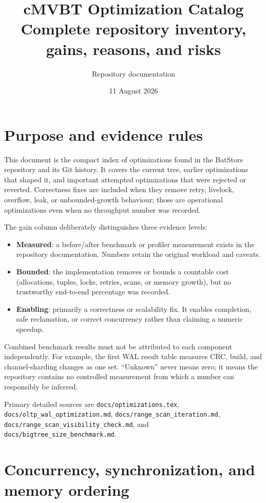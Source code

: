 \documentclass[10pt,a4paper,landscape]{article}
\title{cMVBT Optimization Catalog\\\large Complete repository inventory, gains, reasons, and risks}
\author{Repository documentation}
\date{11 August 2026}
\newcommand{\code}[1]{\texttt{#1}}
\newcommand{\gainmeasured}{\textbf{Measured}}
\newcommand{\gainbounded}{\textbf{Bounded}}
\newcommand{\gainenabling}{\textbf{Enabling}}
\begin{document}
\maketitle

\section*{Purpose and evidence rules}

This document is the compact index of optimizations found in the BatStore repository and
its Git history. It covers the current tree, earlier optimizations that shaped it, and
important attempted optimizations that were rejected or reverted. Correctness fixes are
included when they remove retry, livelock, overflow, leak, or unbounded-growth behaviour;
those are operational optimizations even when no throughput number was recorded.

The gain column deliberately distinguishes three evidence levels:

\begin{itemize}
  \item \gainmeasured{}: a before/after benchmark or profiler measurement exists in the
        repository documentation. Numbers retain the original workload and caveats.
  \item \gainbounded{}: the implementation removes or bounds a countable cost (allocations,
        tuples, locks, retries, scans, or memory growth), but no trustworthy end-to-end
        percentage was recorded.
  \item \gainenabling{}: primarily a correctness or scalability fix. It enables completion,
        safe reclamation, or correct concurrency rather than claiming a numeric speedup.
\end{itemize}

Combined benchmark results must not be attributed to each component independently. For
example, the first WAL result table measures CRC, build, and channel-sharding changes as
one set. ``Unknown'' never means zero; it means the repository contains no controlled
measurement from which a number can responsibly be inferred.

Primary detailed sources are \code{docs/optimizations.tex},
\code{docs/oltp\_wal\_optimization.md}, \code{docs/range\_scan\_iteration.md},
\code{docs/range\_scan\_visibility\_check.md}, and
\code{docs/bigtree\_size\_benchmark.md}.

\section{Concurrency, synchronization, and memory ordering}
\end{document}
